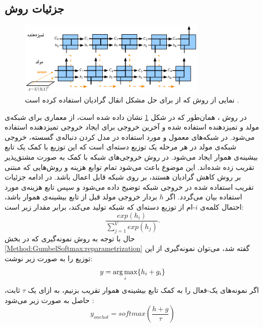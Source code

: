 \subsection{جزئیات روش}
\begin{figure}[!htb]
	\centering
	\includegraphics[width=0.8\textwidth]{images/ArchitectureGumbelGAN.pdf} 
	\caption[
	نمای کلی یک نمونه روش که از 
			برای حل مشکل انتقال گرادیان استفاده کرده است.
	]
	{
		نمایی از روش \cite{kusner2016gans} که از  
		برای حل مشکل انقال گرادیان استفاده کرده است
		\cite{kusner2016gans}.
	}
	\label{Figure:GumbelSoftmax:Architecture}
\end{figure}
در روش
،
همان‌طور که در شکل 
\ref{Figure:GumbelSoftmax:Architecture}
نشان داده شده است، از معماری 
برای شبکه‌ی مولد و تمیزدهنده استفاده شده و آخرین خروجی 
برای ایجاد خروجی تمیزدهنده استفاده می‌شود.
در شبکه‌های  معمول و مورد استفاده در مدل کردن دنباله‌ی گسسته، خروجی شبکه‌ی مولد در هر مرحله یک توزیع دسته‌ای است که این توزیع با کمک یک تابع بیشینه‌ی هموار ایجاد می‌شود. در روش 
خروجی‌های شبکه با کمک
		به صورت مشتق‌پذیر تقریب زده شده‌اند. این موضوع باعث می‌شود تمام توابع هزینه و روش‌هایی که مبتنی بر روش کاهش گرادیان هستند، بر روی شبکه قابل اعمال باشد. در ادامه جزئیات تقریب استفاده شده در خروجی شبکه توضیح داده می‌شود و سپس تابع هزینه‌ی مورد استفاده بیان می‌گردد.
اگر $h$ بردار خروجی مولد قبل از تابع بیشینه‌ی هموار باشد، احتمال کلمه‌ی $i$-ام از توزیع دسته‌ای که شبکه تولید می‌کند، برابر مقدار زیر است:
\begin{equation}
\frac{exp(h_i)}{\sum_{j=1}^{V} exp(h_j)}.
\end{equation}
حال با توجه به روش نمونه‌گیری که در بخش
\ref{Method:GumbelSoftmax:reparametrization}
گفته شد، می‌توان نمونه‌گیری از این توزیع را به صورت زیر نوشت:
\begin{equation}
y = \operatorname*{arg\,max}_i \{h_i + g_i\}
\end{equation}
اگر نمونه‌های یک-فعال را به کمک تابع بیشینه‌ی هموار تقریب بزنیم، به ازای یک $\tau$ ثابت، حاصل به صورت زیر می‌شود
\cite{JanGuPoo17,kusner2016gans}:
\begin{equation}
y_{onehot} = softmax(\frac{h + g}{\tau})
\end{equation}
